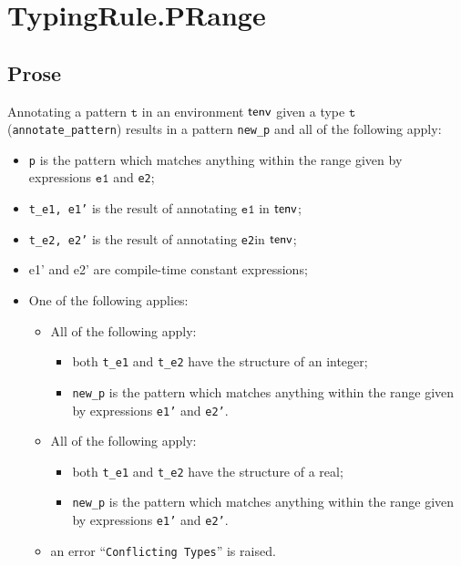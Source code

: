 \documentclass{book}
\newcommand\vt[0]{\texttt{t}}
\newcommand\veone[0]{\texttt{e1}}
\newcommand\vetwo[0]{\texttt{e2}}
\begin{document}

\section{TypingRule.PRange \label{sec:TypingRule.PRange}}

    \subsection{Prose}
   Annotating a pattern $\vt$ in an environment $\textsf{tenv}$ given a type $\vt$ (\texttt{annotate\_pattern}) results in a pattern \texttt{new\_p} and all of the following apply:
   \begin{itemize}
   \item \texttt{p} is the pattern which matches anything within the range given by
      expressions $\veone$ and \vetwo;
   \item \texttt{t\_e1, e1'} is the result of annotating $\veone$ in $\textsf{tenv}$;
   \item \texttt{t\_e2, e2'} is the result of annotating \vetwo in $\textsf{tenv}$;
   \item e1' and e2' are compile-time constant expressions;
   \item One of the following applies:
     \begin{itemize}
     \item All of the following apply:
           \begin{itemize}
           \item both \texttt{t\_e1} and \texttt{t\_e2} have the structure of an integer;
           \item \texttt{new\_p} is the pattern which matches anything within the range given by
      expressions \texttt{e1'} and \texttt{e2'}.
           \end{itemize}
     \item All of the following apply:
           \begin{itemize}
           \item both \texttt{t\_e1} and \texttt{t\_e2} have the structure of a real;
           \item \texttt{new\_p} is the pattern which matches anything within the range given by
      expressions \texttt{e1'} and \texttt{e2'}.
           \end{itemize}
     \item an error ``\texttt{Conflicting Types}'' is raised.
     \end{itemize}
   \end{itemize}
\end{document}
